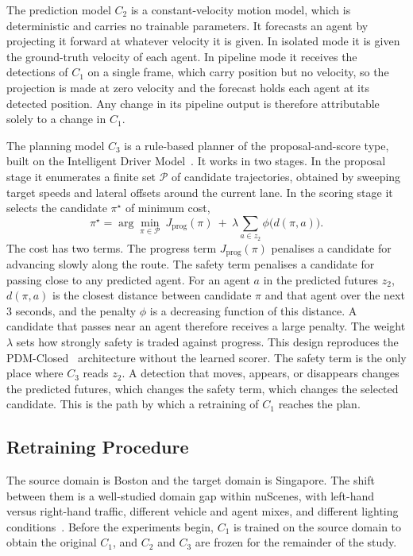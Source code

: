 \documentclass[conference]{IEEEtran}
\begin{document}
The prediction model $C_2$ is a constant-velocity motion model, which is
deterministic and carries no trainable parameters. It forecasts an agent by
projecting it forward at whatever velocity it is given. In isolated mode it is
given the ground-truth velocity of each agent. In pipeline mode it receives the
detections of $C_1$ on a single frame, which carry position but no velocity, so
the projection is made at zero velocity and the forecast holds each agent at its
detected position. Any change in its pipeline output is therefore attributable
solely to a change in $C_1$.

The planning model $C_3$ is a rule-based planner of the proposal-and-score type,
built on the Intelligent Driver Model~\cite{treiber2000idm}. It works in two
stages. In the proposal stage it enumerates a finite set $\mathcal{P}$ of
candidate trajectories, obtained by sweeping target speeds and lateral offsets
around the current lane. In the scoring stage it selects the candidate
$\pi^{\star}$ of minimum cost,
\begin{equation}
\pi^{\star} = \arg\min_{\pi \in \mathcal{P}}\
J_{\text{prog}}(\pi)
\ +\ \lambda \!\!\sum_{a \in z_2} \phi\bigl(d(\pi, a)\bigr).
\label{eq:idm}
\end{equation}
The cost has two terms. The progress term $J_{\text{prog}}(\pi)$ penalises a
candidate for advancing slowly along the route. The safety term penalises a
candidate for passing close to any predicted agent. For an agent $a$ in the
predicted futures $z_2$, $d(\pi,a)$ is the closest distance between candidate
$\pi$ and that agent over the next $3$ seconds, and the penalty $\phi$ is a
decreasing function of this distance. A candidate that passes near an agent
therefore receives a large penalty. The weight $\lambda$ sets how strongly safety
is traded against progress.
This design reproduces the PDM-Closed~\cite{dauner2023parting} architecture without
the learned scorer. The safety term is the only place where $C_3$ reads
$z_2$. A detection that moves, appears, or disappears changes the predicted
futures, which changes the safety term, which changes the selected candidate.
This is the path by which a retraining of $C_1$ reaches the plan.

\subsection{Retraining Procedure}
\label{sec:experiment}
The source domain is Boston and the target domain is Singapore. The shift between
them is a well-studied domain gap within nuScenes, with left-hand versus
right-hand traffic, different vehicle and agent mixes, and different lighting
conditions~\cite{caesar2020nuscenes}. Before the experiments begin, $C_1$ is
trained on the source domain to obtain the original $C_1$, and $C_2$ and $C_3$
are frozen for the remainder of the study.
\end{document}
